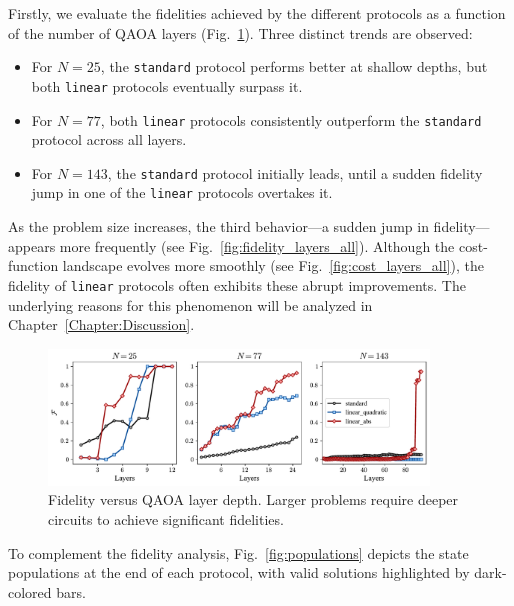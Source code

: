 Firstly, we evaluate the fidelities achieved by the different protocols as a function of the number of QAOA layers (Fig.~\ref{fig:fidelity_layers}). Three distinct trends are observed:  
\begin{itemize}
    \item For $N = 25$, the \texttt{standard} protocol performs better at shallow depths, but both \texttt{linear} protocols eventually surpass it.  
    \item For $N = 77$, both \texttt{linear} protocols consistently outperform the \texttt{standard} protocol across all layers.  
    \item For $N = 143$, the \texttt{standard} protocol initially leads, until a sudden fidelity jump in one of the \texttt{linear} protocols overtakes it.  
\end{itemize}

As the problem size increases, the third behavior---a sudden jump in fidelity---appears more frequently (see Fig.~\ref{fig:fidelity_layers_all}). Although the cost-function landscape evolves more smoothly (see Fig.~\ref{fig:cost_layers_all}), the fidelity of \texttt{linear} protocols often exhibits these abrupt improvements. The underlying reasons for this phenomenon will be analyzed in Chapter~\ref{Chapter:Discussion}.

\begin{figure}[h]
    \centering
    \includegraphics[width=0.9\textwidth]{04-results/figs/fidelity_layers_2577143.pdf}
    \caption{Fidelity versus QAOA layer depth. Larger problems require deeper circuits to achieve significant fidelities.}
    \label{fig:fidelity_layers}
\end{figure}

To complement the fidelity analysis, Fig.~\ref{fig:populations} depicts the state populations at the end of each protocol, with valid solutions highlighted by dark-colored bars.

